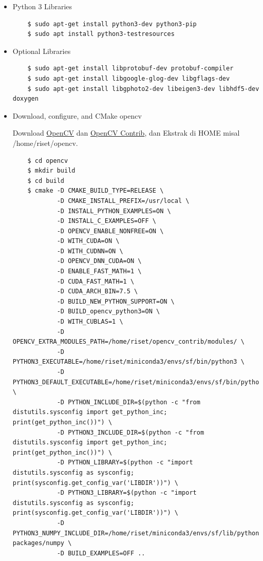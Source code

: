 \begin{itemize}
  \item Python 3 Libraries
  
  \begin{lstlisting}
    $ sudo apt-get install python3-dev python3-pip
    $ sudo apt install python3-testresources
  \end{lstlisting}

  \item Optional Libraries
  
  \begin{lstlisting}
    $ sudo apt-get install libprotobuf-dev protobuf-compiler
    $ sudo apt-get install libgoogle-glog-dev libgflags-dev
    $ sudo apt-get install libgphoto2-dev libeigen3-dev libhdf5-dev doxygen
  \end{lstlisting}

  \item Download, configure, and CMake opencv
  
  Download \href{https://github.com/opencv/opencv/archive/refs/tags/4.5.1.zip}{OpenCV} dan \href{https://github.com/opencv/opencv_contrib/archive/refs/tags/4.5.1.zip}{OpenCV Contrib}, dan Ekstrak di HOME misal /home/riset/opencv.

  \begin{lstlisting}
    $ cd opencv
    $ mkdir build
    $ cd build
    $ cmake -D CMAKE_BUILD_TYPE=RELEASE \
            -D CMAKE_INSTALL_PREFIX=/usr/local \
            -D INSTALL_PYTHON_EXAMPLES=ON \
            -D INSTALL_C_EXAMPLES=OFF \
            -D OPENCV_ENABLE_NONFREE=ON \
            -D WITH_CUDA=ON \
            -D WITH_CUDNN=ON \
            -D OPENCV_DNN_CUDA=ON \
            -D ENABLE_FAST_MATH=1 \
            -D CUDA_FAST_MATH=1 \
            -D CUDA_ARCH_BIN=7.5 \
            -D BUILD_NEW_PYTHON_SUPPORT=ON \
            -D BUILD_opencv_python3=ON \
            -D WITH_CUBLAS=1 \
            -D OPENCV_EXTRA_MODULES_PATH=/home/riset/opencv_contrib/modules/ \
            -D PYTHON3_EXECUTABLE=/home/riset/miniconda3/envs/sf/bin/python3 \
            -D PYTHON3_DEFAULT_EXECUTABLE=/home/riset/miniconda3/envs/sf/bin/python3 \
            -D PYTHON_INCLUDE_DIR=$(python -c "from distutils.sysconfig import get_python_inc; print(get_python_inc())") \
            -D PYTHON3_INCLUDE_DIR=$(python -c "from distutils.sysconfig import get_python_inc; print(get_python_inc())") \
            -D PYTHON_LIBRARY=$(python -c "import distutils.sysconfig as sysconfig; print(sysconfig.get_config_var('LIBDIR'))") \
            -D PYTHON3_LIBRARY=$(python -c "import distutils.sysconfig as sysconfig; print(sysconfig.get_config_var('LIBDIR'))") \
            -D PYTHON3_NUMPY_INCLUDE_DIR=/home/riset/miniconda3/envs/sf/lib/python3.6/site-packages/numpy \
            -D BUILD_EXAMPLES=OFF ..
  \end{lstlisting}


\end{itemize}

